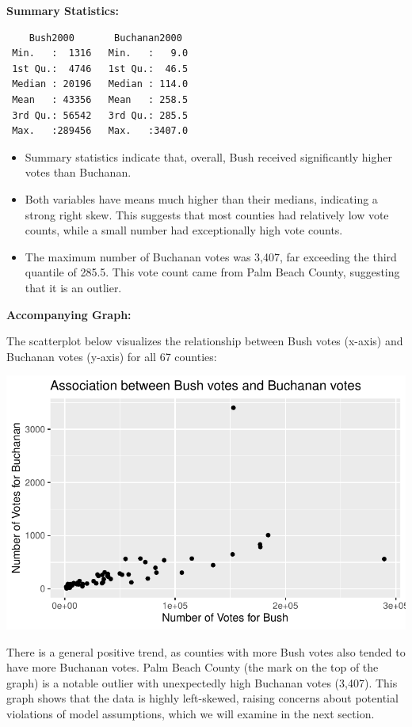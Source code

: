 \documentclass[
  letterpaper,
  DIV=11,
  numbers=noendperiod]{scrartcl}
\begin{document}
\textbf{Summary Statistics:}

\begin{verbatim}
    Bush2000       Buchanan2000   
 Min.   :  1316   Min.   :   9.0  
 1st Qu.:  4746   1st Qu.:  46.5  
 Median : 20196   Median : 114.0  
 Mean   : 43356   Mean   : 258.5  
 3rd Qu.: 56542   3rd Qu.: 285.5  
 Max.   :289456   Max.   :3407.0  
\end{verbatim}

\begin{itemize}
\item
  Summary statistics indicate that, overall, Bush received significantly
  higher votes than Buchanan.
\item
  Both variables have means much higher than their medians, indicating a
  strong right skew. This suggests that most counties had relatively low
  vote counts, while a small number had exceptionally high vote counts.
\item
  The maximum number of Buchanan votes was 3,407, far exceeding the
  third quantile of 285.5. This vote count came from Palm Beach County,
  suggesting that it is an outlier.
\end{itemize}

\textbf{Accompanying Graph:}

The scatterplot below visualizes the relationship between Bush votes
(x-axis) and Buchanan votes (y-axis) for all 67 counties:

\includegraphics{SDS-291-case-study-1_files/figure-pdf/unnamed-chunk-3-1.pdf}

There is a general positive trend, as counties with more Bush votes also
tended to have more Buchanan votes. Palm Beach County (the mark on the
top of the graph) is a notable outlier with unexpectedly high Buchanan
votes (3,407). This graph shows that the data is highly left-skewed,
raising concerns about potential violations of model assumptions, which
we will examine in the next section.
\end{document}
